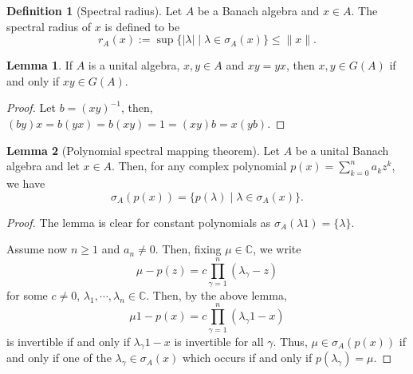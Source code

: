 \documentclass[]{article}
\theoremstyle{definition}
\newtheorem{definition}{Definition}[section]
\newtheorem{lemma}{Lemma}[section]
\begin{document}
\begin{definition}[Spectral radius]
  Let \(A\) be a Banach algebra and \(x \in A\). The spectral radius of \(x\) is defined to be 
  \[r_A(x) := \sup \{|\lambda| \mid \lambda \in \sigma_A(x)\} \le \|x\|.\]
\end{definition}

\begin{lemma}
  If \(A\) is a unital algebra, \(x, y \in A\) and \(xy = yx\), then 
  \(x, y \in G(A)\) if and only if \(xy \in G(A)\).
\end{lemma}
\begin{proof}
  Let \(b = (xy)^{-1}\), then, \((by)x = b(yx) = b(xy) = 1 = (xy)b = x(yb)\).
\end{proof}

\begin{lemma}[Polynomial spectral mapping theorem]
  Let \(A\) be a unital Banach algebra and let \(x \in A\). Then, for any complex polynomial 
  \(p(x) = \sum_{k = 0}^n a_k z^k\), we have 
  \[\sigma_A(p(x)) = \{p(\lambda) \mid \lambda \in \sigma_A(x)\}.\] 
\end{lemma}
\begin{proof}
  The lemma is clear for constant polynomials as \(\sigma_A(\lambda 1) = \{\lambda\}\).

  Assume now \(n \ge 1\) and \(a_n \neq 0\). Then, fixing \(\mu \in \mathbb{C}\), we write 
  \[\mu - p(z) = c \prod_{\gamma = 1}^n (\lambda_\gamma - z)\]
  for some \(c \neq 0\), \(\lambda_1, \cdots, \lambda_n \in \mathbb{C}\). Then, by the above lemma,
  \[\mu 1 - p(x) = c \prod_{\gamma = 1}^n (\lambda_\gamma 1 - x)\]
  is invertible if and only if \(\lambda_\gamma 1 - x\) is invertible for all \(\gamma\). Thus, 
  \(\mu \in \sigma_A(p(x))\) if and only if one of the \(\lambda_\gamma \in \sigma_A(x)\) which 
  occurs if and only if \(p(\lambda_\gamma) = \mu\).
\end{proof}
\end{document}
